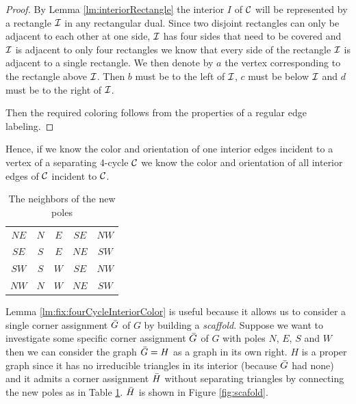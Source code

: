   \begin{proof}
  By Lemma \ref{lm:interiorRectangle} the interior $I$ of $\mathcal{C}$ will be represented by a rectangle $\mathcal{I}$ in any rectangular dual. Since two disjoint rectangles can only be adjacent to each other at one side, $\mathcal{I}$ has four sides that need to be covered and $\mathcal{I}$ is adjacent to only four rectangles we know that every side of the rectangle $\mathcal{I}$ is adjacent to a single rectangle. We then denote by $a$ the vertex corresponding to the rectangle above $\mathcal{I}$. Then $b$ must be to the left of $\mathcal{I}$, $c$ must be below $\mathcal{I}$ and $d$ must be to the right of $\mathcal{I}$.

  Then the required coloring follows from the properties of a regular edge labeling.

  \end{proof}

  Hence, if we know the color and orientation of one interior edges incident to a vertex of a separating $4$-cycle $\mathcal{C}$ we know the color and orientation of all interior edges of $\mathcal{C}$ incident to $\mathcal{C}$.

  \begin{table}
    \centering
    \begin{tabular}{c|| c c c c}
      $NE$ & $N$ & $ E$ & $ SE$ & $ NW$ \\
      $SE$ & $S$ & $ E$ & $ NE$ & $ SW$\\
      $SW$ & $S$ & $ W$ & $ SE$ & $ NW$\\
      $NW$ & $N$ & $ W$ & $ NE$ & $ SW$\\
    \end{tabular}
    \caption{The neighbors of the new poles}
    \label{tab:scaffold}
  \end{table}

  Lemma \ref{lm:fix:fourCycleInteriorColor} is useful because it allows us to consider a single corner assignment $\bar{G}$ of $G$ by building a \emph{scaffold}. Suppose we want to investigate some specific corner assignment $\bar{G}$ of $G$ with poles $N$, $E$, $S$ and $W$ then we can consider the graph $\bar{G} = H$ as a graph in its own right.
   $H$ is a proper graph since it has no irreducible triangles in its interior (because $\bar{G}$ had none) and it admits a corner assignment $\bar{H}$ without separating triangles by connecting the new poles as in Table \ref{tab:scaffold}. $\bar{H}$ is shown in Figure \ref{fig:scafold}.

